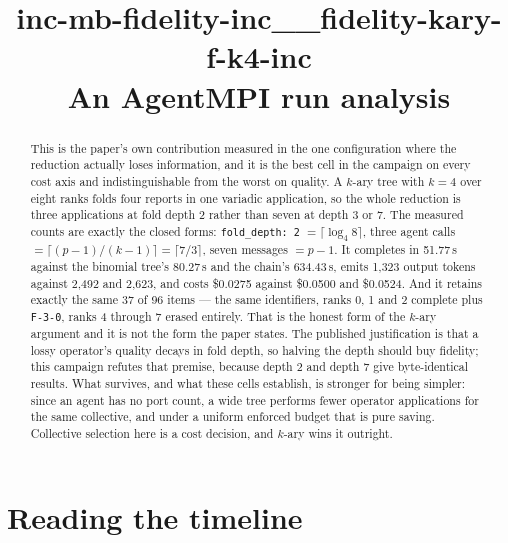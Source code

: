 \documentclass[11pt]{article}
\title{\textbf{inc-mb-fidelity-inc\_\_fidelity-kary-f-k4-inc}\\[2pt]\large An AgentMPI run analysis}
\author{}
\date{}
\begin{document}
\maketitle

\begin{abstract}
This is the paper's own contribution measured in the one configuration where the reduction
actually loses information, and it is the best cell in the campaign on every cost axis and
indistinguishable from the worst on quality. A $k$-ary tree with $k=4$ over eight ranks
folds four reports in one variadic application, so the whole reduction is three
applications at fold depth 2 rather than seven at depth 3 or 7. The measured counts are
exactly the closed forms: \texttt{fold\_depth: 2} $=\lceil\log_4 8\rceil$, three agent
calls $=\lceil (p-1)/(k-1)\rceil = \lceil 7/3\rceil$, seven messages $=p-1$. It completes
in 51.77\,s against the binomial tree's 80.27\,s and the chain's 634.43\,s, emits 1{,}323
output tokens against 2{,}492 and 2{,}623, and costs \$0.0275 against \$0.0500 and
\$0.0524. And it retains exactly the same 37 of 96 items --- the same identifiers, ranks 0,
1 and 2 complete plus \texttt{F-3-0}, ranks 4 through 7 erased entirely. That is the honest
form of the $k$-ary argument and it is not the form the paper states. The published
justification is that a lossy operator's quality decays in fold depth, so halving the depth
should buy fidelity; this campaign refutes that premise, because depth 2 and depth 7 give
byte-identical results. What survives, and what these cells establish, is stronger for
being simpler: since an agent has no port count, a wide tree performs fewer operator
applications for the same collective, and under a uniform enforced budget that is pure
saving. Collective selection here is a cost decision, and $k$-ary wins it outright.
\end{abstract}



\section{Reading the timeline}
\end{document}
